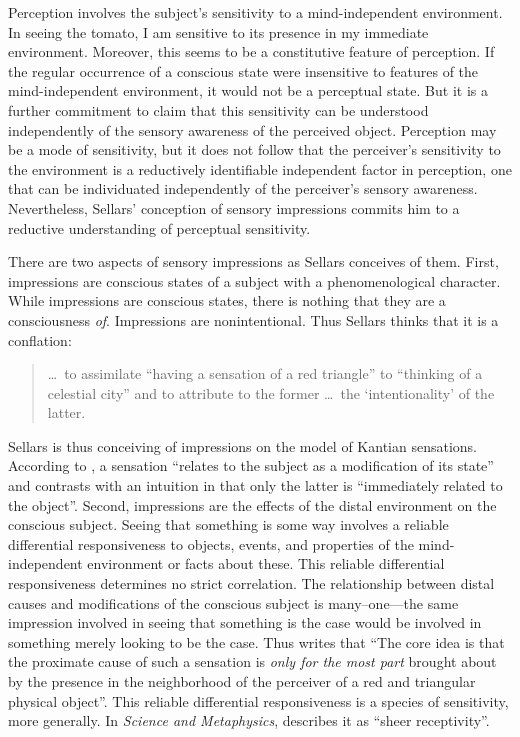 \documentclass[12pt]{article}
\begin{document}
Perception involves the subject's sensitivity to a mind-independent environment. In seeing the tomato, I am sensitive to its presence in my immediate environment. Moreover, this seems to be a constitutive feature of perception. If the regular occurrence of a conscious state were insensitive to features of the mind-independent environment, it would not be a perceptual state. But it is a further commitment to claim that this sensitivity can be understood independently of the sensory awareness of the perceived object. Perception may be a mode of sensitivity, but it does not follow that the perceiver's sensitivity to the environment is a reductively identifiable independent factor in perception, one that can be individuated independently of the perceiver's sensory awareness. Nevertheless, Sellars' conception of sensory impressions commits him to a reductive understanding of perceptual sensitivity.

There are two aspects of sensory impressions as Sellars conceives of them. First, impressions are conscious states of a subject with a phenomenological character. While impressions are conscious states, there is nothing that they are a consciousness \emph{of}. Impressions are nonintentional. Thus Sellars thinks that it is a conflation:
\begin{quote}
    \ldots\ to assimilate ``having a sensation of a red triangle'' to ``thinking of a celestial city'' and to attribute to the former \ldots\ the `intentionality' of the latter. \citep[§7]{Sellars:1956xp}
\end{quote}
Sellars is thus conceiving of impressions on the model of Kantian sensations. According to \citet[B376--7]{Kant:1781fk}, a sensation ``relates to the subject as a modification of its state'' and contrasts with  an intuition in that only the latter is ``immediately related to the object''. Second, impressions are the effects of the distal environment on the conscious subject. Seeing that something is some way involves a reliable differential responsiveness to objects, events, and properties of the mind-independent environment or facts about these. This reliable differential responsiveness determines no strict correlation. The relationship between distal causes and modifications of the conscious subject is many--one---the same impression involved in seeing that something is the case would be involved in something merely looking to be the case. Thus \citet[§7]{Sellars:1956xp} writes that ``The core idea is that the proximate cause of such a sensation is \emph{only for the most part} brought about by the presence in the neighborhood of the perceiver of a red and triangular physical object''. This reliable differential responsiveness is a species of sensitivity, more generally. In \emph{Science and Metaphysics}, \citet[4]{Sellars:1967uq} describes it as ``sheer receptivity''.
\end{document}
